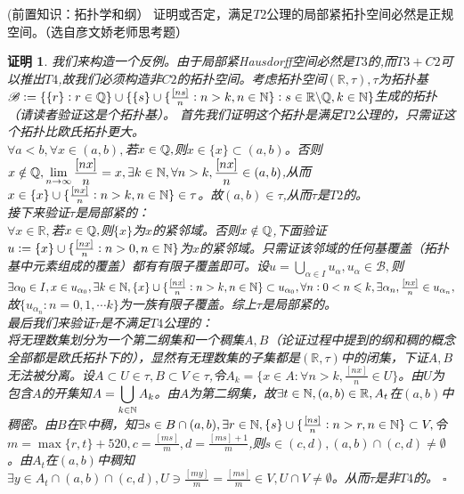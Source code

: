 \documentclass[UTF8, a4paper, 12pt, oneside, twocolumn]{article}
\numberwithin{equation}{section}
\numberwithin{figure}{section}
\numberwithin{table}{section}
\def\dbigcup{\displaystyle\bigcup}	%
\def\R{\mathbb{R}}	%
\newtheorem*{Proof}{证明}
\newif\ifproof
\newenvironment{Ex}[1][]{\prooffalse \begin{EExercise}{#1}{}}%
{\ifproof%
\hfill\ensuremath{\square}\end{Proof}%
\fi%
\end{EExercise}}
\newcommand{\pr}{\tcblower \begin{Proof}\prooftrue }
\begin{document}
\begin{Ex}[(前置知识：拓扑学和纲）]
证明或否定，满足$T2$公理的局部紧拓扑空间必然是正规空间。（选自彦文娇老师思考题）
\pr
我们来构造一个反例。由于局部紧Hausdorff空间必然是$T3$的,而$T3+C2$可以推出$T4$,故我们必须构造非$C2$的拓扑空间。考虑拓扑空间$(\R,\tau),\tau$为拓扑基$\mathscr{B}:=\{\{r\}:r\in\Q\}\cup\{\{s\}\cup\{\frac{[ns]}{n}:n > k,n\in\N\}:s\in\R\backslash\Q,k\in\N\}$生成的拓扑（请读者验证这是个拓扑基）。
首先我们证明这个拓扑是满足$T2$公理的，只需证这个拓扑比欧氏拓扑更大。\\
$\forall a<b,\forall x\in (a,b),$若$x\in\mathbb{Q},$则$x\in\{x\}\subset (a,b)$。否则$x\notin\mathbb{Q},\displaystyle\lim_{n\rightarrow \infty}\frac{[nx]}{n}=x,\exists k\in\mathbb{N},\forall n>k,\frac{[nx]}{n}\in (a,b)$,从而$x\in\{x\}\cup\{\frac{[nx]}{n}:n > k,n\in\mathbb{N}\}\in\tau$。故$(a,b)\in\tau$,从而$\tau$是$T2$的。\\
接下来验证$\tau$是局部紧的：\\
$\forall x\in\R,$若$x\in\mathbb{Q},$则$\{x\}$为$x$的紧邻域。否则$x\notin\mathbb{Q}$,下面验证$u:=\{x\}\cup\{\frac{[nx]}{n}:n > 0,n\in\mathbb{N}\}$为$x$的紧邻域。只需证该邻域的任何基覆盖（拓扑基中元素组成的覆盖）都有有限子覆盖即可。设$u=\dbigcup_{\alpha \in I}u_\alpha,u_\alpha\in\mathscr{B},$则$\exists \alpha_0\in I,x\in u_{\alpha_0},\exists k\in\mathbb{N},\{x\}\cup\{\frac{[nx]}{n}:n > k,n\in\mathbb{N}\}\subset u_{\alpha_0},\forall n:0<n\leqslant k,\exists \alpha_n,\frac{[nx]}{n}\in u_{\alpha_n},$故$\{u_{\alpha_n}:n=0,1,\cdots k\}$为一族有限子覆盖。综上$\tau$是局部紧的。\\
最后我们来验证$\tau$是不满足$T4$公理的：\\
将无理数集划分为一个第二纲集和一个稠集$A,B$（论证过程中提到的纲和稠的概念全部都是欧氏拓扑下的），显然有无理数集的子集都是$(\R,\tau)$中的闭集，下证$A,B$无法被分离。设$A\subset U\in\tau,B\subset V\in\tau$,令$A_k=\{x\in A:\forall n>k,\frac{[nx]}{n}\in U\}$。由$U$为包含$A$的开集知$A=\dbigcup_{k\in\N}A_k$。由$A$为第二纲集，故$\exists t\in\N,(a,b)\in\R,A_t$在$(a,b)$中稠密。由$B$在$\R$中稠，知$\exists s\in B\cap (a,b),\exists r\in\mathbb{N},\{s\}\cup\{\frac{[ns]}{n}:n > r,n\in\mathbb{N}\}\subset V,$令$m=\max\{r,t\}+520,c=\frac{[ms]}{m},d=\frac{[ms]+1}{m}$,则$s\in (c,d),(a,b)\cap(c,d)\neq\emptyset$。由$A_t$在$(a,b)$中稠知$\exists y\in A_t\cap (a,b)\cap(c,d),U\ni\frac{[my]}{m}=\frac{[ms]}{m}\in V,U\cap V\neq\emptyset$。从而$\tau$是非$T4$的。
\end{Ex}
\end{document}
